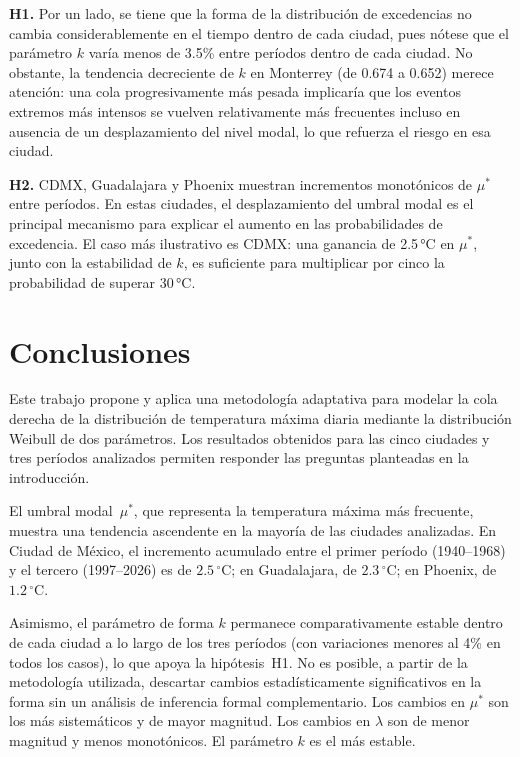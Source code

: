 \documentclass[APA,STIX1COL]{WileyNJD-v2}
\begin{document}
{\textbf{H1.} Por un lado, se tiene que la forma de la distribución de excedencias no cambia considerablemente en el tiempo dentro de cada
ciudad, pues nótese que el parámetro $k$ varía menos de 3.5\% entre períodos
dentro de cada ciudad. No obstante, la tendencia
decreciente de $k$ en Monterrey (de 0.674 a 0.652)
merece atención: una cola progresivamente más pesada implicaría
que los eventos extremos más intensos se vuelven relativamente
más frecuentes incluso en ausencia de un desplazamiento del nivel
modal, lo que refuerza el riesgo en esa ciudad.

\textbf{H2.}
CDMX, Guadalajara y Phoenix muestran incrementos monotónicos de
$\mu^*$ entre períodos. En estas ciudades, el desplazamiento del
umbral modal es el principal mecanismo para explicar el aumento
en las probabilidades de excedencia. El caso más ilustrativo es
CDMX: una ganancia de 2.5\,°C en $\mu^*$, junto con la estabilidad
de $k$, es suficiente para multiplicar por cinco la
probabilidad de superar 30\,°C.

\section{Conclusiones}\label{sec:conclusions}

Este trabajo propone y aplica una metodolog\'ia adaptativa para modelar
la cola derecha de la distribuci\'on de temperatura m\'axima diaria
mediante la distribuci\'on Weibull de dos par\'ametros. Los resultados
obtenidos para las cinco ciudades y tres per\'iodos analizados permiten
responder las preguntas planteadas en la introducci\'on.

El umbral modal~$\mu^*$, que representa la temperatura m\'axima m\'as
frecuente, muestra una tendencia ascendente en la mayor\'ia de las
ciudades analizadas. En Ciudad de M\'exico, el incremento acumulado
entre el primer per\'iodo (1940--1968) y el tercero (1997--2026) es de
$2.5\,{}^\circ\mathrm{C}$; en Guadalajara, de
$2.3\,{}^\circ\mathrm{C}$; en Phoenix, de $1.2\,{}^\circ\mathrm{C}$.

Asimismo, el par\'ametro de forma $k$ permanece comparativamente estable dentro
de cada ciudad a lo largo de los tres per\'iodos (con variaciones menores al
4\% en todos los casos), lo que apoya la hip\'otesis~H1. No es posible,
a partir de la metodolog\'ia utilizada, descartar cambios estad\'isticamente
significativos en la forma sin un an\'alisis de inferencia formal
complementario. Los cambios en $\mu^*$ son los m\'as sistem\'aticos
y de mayor magnitud. Los cambios en $\lambda$ son de menor magnitud y
menos monotónicos. El par\'ametro $k$ es el m\'as estable.

}
\end{document}
